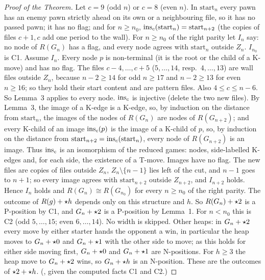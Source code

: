 \begin{wallproof}
\begin{proof}[Proof of the Theorem]
Let $c=9$ (odd $n$) or $c=8$ (even $n$). In $\mathrm{start}_n$ every pawn has an enemy pawn strictly ahead on its own or a neighbouring
file, so it has no passed pawn; it has no flag; and for $n\ge n_0$, $\operatorname{ins}_c(\mathrm{start}_n)=\mathrm{start}_{n+2}$ (the copies of files
$c+1,c$ add one period to the wall). For $n\ge n_0$ of the right parity let $I_n$ say: no node of $R(G_n)$ has a flag, and every node agrees with
$\mathrm{start}_n$ outside $Z_n$. $I_{n_0}$ is C1.
Assume $I_n$. Every node $p$ is non-terminal (it is the root or the child of a K-move) and has no flag. The files $c-4,\dots,c+5$
($5,\dots,14$, resp.\ $4,\dots,13$) are wall files outside $Z_n$, because $n-2\ge14$ for odd $n\ge17$ and $n-2\ge13$ for even
$n\ge16$; so they hold their start content and are pattern files. Also $4\le c\le n-6$. So Lemma~3 applies to every node.
$\operatorname{ins}_c$ is injective (delete the two new files). By Lemma~3, the image of a K-edge is a K-edge, so, by induction on the distance from
$\mathrm{start}_n$, the images of the nodes of $R(G_n)$ are nodes of $R(G_{n+2})$; and every K-child of an image $\operatorname{ins}_c(p)$ is the image of a K-child of $p$, so, by induction on the distance
from $\mathrm{start}_{n+2}=\operatorname{ins}_c(\mathrm{start}_n)$, every node of $R(G_{n+2})$ is an image. Thus $\operatorname{ins}_c$ is an isomorphism of the
reduced games: nodes, side-labelled K-edges and, for each side, the existence of a T-move. Images have no flag. The new files are copies of files outside $Z_n$, $Z_n\setminus\{n-1\}$ lies left of the cut, and $n-1$ goes to
$n+1$; so every image agrees with $\mathrm{start}_{n+2}$ outside $Z_{n+2}$, and $I_{n+2}$ holds.
Hence $I_n$ holds and $R(G_n)\cong R(G_{n_0})$ for every $n\ge n_0$ of the right parity. The outcome of $R(g)+\mathord{\star h}$ depends only on
this structure and $h$. So $R(G_n)+\mathord{\star2}$ is a P-position by C1, and
$G_n+\mathord{\star2}$ is a P-position by Lemma~1. For $n<n_0$ this is C2 (odd $5,\dots,15$; even $6,\dots,14$). No width is skipped.
Other heaps: in $G_n+\mathord{\star2}$ every move by either starter hands the opponent a win, in particular the heap moves to $G_n+\mathord{\star0}$ and $G_n+\mathord{\star1}$ with the other side to
move; as this holds for either side moving first, $G_n+\mathord{\star0}$ and $G_n+\mathord{\star1}$ are N-positions. For $h\ge3$ the heap move to $G_n+\mathord{\star2}$
wins, so $G_n+\mathord{\star h}$ is an N-position. These are the outcomes of $\mathord{\star2}+\mathord{\star h}$.
(, given the computed facts C1 and C2.)
\end{proof}


\end{wallproof}

